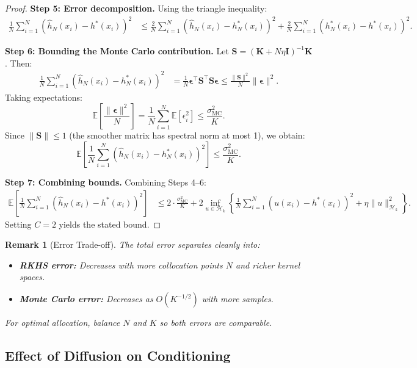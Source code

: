 \documentclass[11pt,a4paper]{article}
\newtheorem{remark}[theorem]{Remark}
\newcommand{\E}{\mathbb{E}}
\newcommand{\RKHS}{\mathcal{H}_k}
\newcommand{\bK}{\mathbf{K}}
\newcommand{\bI}{\mathbf{I}}
\newcommand{\bS}{\mathbf{S}}
\begin{document}
\begin{proof}
\textbf{Step 5: Error decomposition.}
Using the triangle inequality:
\begin{align}
\frac{1}{N}\sum_{i=1}^N (\widehat{h}_N(x_i) - h^*(x_i))^2 &\leq \frac{2}{N}\sum_{i=1}^N (\widehat{h}_N(x_i) - h_N^*(x_i))^2 + \frac{2}{N}\sum_{i=1}^N (h_N^*(x_i) - h^*(x_i))^2.
\end{align}

\textbf{Step 6: Bounding the Monte Carlo contribution.}
Let $\bS = (\bK + N\eta \bI)^{-1} \bK$. Then:
\begin{align}
\frac{1}{N}\sum_{i=1}^N (\widehat{h}_N(x_i) - h_N^*(x_i))^2 &= \frac{1}{N}\boldsymbol{\epsilon}^\top \bS^\top \bS \boldsymbol{\epsilon} \leq \frac{\|\bS\|^2}{N} \|\boldsymbol{\epsilon}\|^2.
\end{align}
Taking expectations:
\begin{equation}
\E\left[\frac{\|\boldsymbol{\epsilon}\|^2}{N}\right] = \frac{1}{N}\sum_{i=1}^N \E[\epsilon_i^2] \leq \frac{\sigma_{\mathrm{MC}}^2}{K}.
\end{equation}
Since $\|\bS\| \leq 1$ (the smoother matrix has spectral norm at most 1), we obtain:
\begin{equation}
\E\left[\frac{1}{N}\sum_{i=1}^N (\widehat{h}_N(x_i) - h_N^*(x_i))^2\right] \leq \frac{\sigma_{\mathrm{MC}}^2}{K}.
\end{equation}

\textbf{Step 7: Combining bounds.}
Combining Steps 4--6:
\begin{align}
\E\left[\frac{1}{N}\sum_{i=1}^N (\widehat{h}_N(x_i) - h^*(x_i))^2\right] &\leq 2 \cdot \frac{\sigma_{\mathrm{MC}}^2}{K} + 2 \inf_{u \in \RKHS}\left\{\frac{1}{N}\sum_{i=1}^N(u(x_i) - h^*(x_i))^2 + \eta\|u\|_{\RKHS}^2\right\}.
\end{align}
Setting $C = 2$ yields the stated bound.
\end{proof}

\begin{remark}[Error Trade-off]
The total error separates cleanly into:
\begin{itemize}
\item \textbf{RKHS error:} Decreases with more collocation points $N$ and richer kernel spaces.
\item \textbf{Monte Carlo error:} Decreases as $O(K^{-1/2})$ with more samples.
\end{itemize}
For optimal allocation, balance $N$ and $K$ so both errors are comparable.
\end{remark}

\subsection{Effect of Diffusion on Conditioning}
\end{document}
